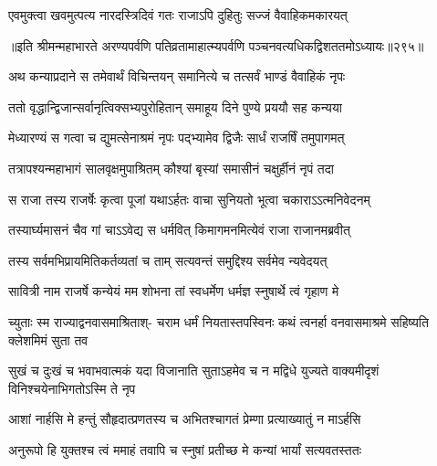 \begin{center}



\twolineshloka
{एवमुक्त्वा खवमुत्पत्य नारदस्त्रिदिवं गतः}
{राजाऽपि दुहितुः सज्जं वैवाहिकमकारयत्}


॥इति श्रीमन्महाभारते अरण्यपर्वणि
पतिव्रतामाहात्म्यपर्वणि पञ्चनवत्यधिकद्विशततमोऽध्यायः॥२९५॥




\twolineshloka
{अथ कन्याप्रदाने स तमेवार्थं विचिन्तयन्}
{समानित्ये च तत्सर्वं भाण्डं वैवाहिकं नृपः}


\twolineshloka
{ततो वृद्धान्द्विजान्सर्वानृत्विक्सभ्यपुरोहितान्}
{समाहूय दिने पुण्ये प्रययौ सह कन्यया}


\twolineshloka
{मेध्यारण्यं स गत्वा च द्युमत्सेनाश्रमं नृपः}
{पद्भ्यामेव द्विजैः सार्धं राजर्षिं तमुपागमत्}


\twolineshloka
{तत्रापश्यन्महाभागं सालवृक्षमुपाश्रितम्}
{कौश्यां बृस्यां समासीनं चक्षुर्हीनं नृपं तदा}


\twolineshloka
{स राजा तस्य राजर्षेः कृत्वा पूजां यथाऽर्हतः}
{वाचा सुनियतो भूत्वा चकाराऽऽत्मनिवेदनम्}


\twolineshloka
{तस्यार्घ्यमासनं चैव गां चाऽऽवेद्य स धर्मवित्}
{किमागमनमित्येवं राजा राजानमब्रवीत्}


\twolineshloka
{तस्य सर्वमभिप्रायमितिकर्तव्यतां च ताम्}
{सत्यवन्तं समुद्दिश्य सर्वमेव न्यवेदयत्}


\twolineshloka
{सावित्री नाम राजर्षे कन्येयं मम शोभना}
{तां स्वधर्मेण धर्मज्ञ स्नुषार्थे त्वं गृहाण मे}




\fourlineindentedshloka
{च्युताः स्म राज्याद्वनवासमाश्रिताश्-}
{चराम धर्मं नियतास्तपस्विनः}
{कथं त्वनर्हा वनवासमाश्रमे}
{सहिष्यति क्लेशमिमं सुता तव}




\fourlineindentedshloka
{सुखं च दुःखं च भवाभवात्मकं}
{यदा विजानाति सुताऽहमेव च}
{न मद्विधे युज्यते वाक्यमीदृशं}
{विनिश्चयेनाभिगतोऽस्मि ते नृप}


\twolineshloka
{आशां नार्हसि मे हन्तुं सौहृदात्प्रणतस्य च}
{अभितश्चागतं प्रेम्णा प्रत्याख्यातुं न माऽर्हसि}


\twolineshloka
{अनुरूपो हि युक्तश्च त्वं ममाहं तवापि च}
{स्नुषां प्रतीच्छ मे कन्यां भार्यां सत्यवतस्ततः}





\end{center}
